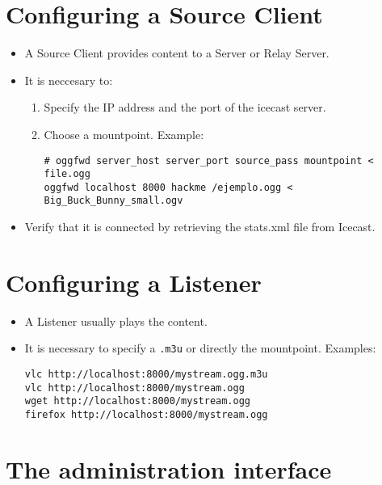 
\section{Configuring a Source Client}

\begin{itemize}
\item A Source Client provides content to a Server or Relay Server.
\item It is neccesary to:
  \begin{enumerate}
  \item Specify the IP address and the port of the icecast server.
  \item Choose a mountpoint. Example:
\begin{verbatim}
# oggfwd server_host server_port source_pass mountpoint < file.ogg
oggfwd localhost 8000 hackme /ejemplo.ogg < Big_Buck_Bunny_small.ogv
\end{verbatim}
  \end{enumerate}
\item Verify that it is connected by retrieving the stats.xml file
  from Icecast.
\end{itemize}


\section{Configuring a Listener}

\begin{itemize}
\item A Listener usually plays the content. 
\item It is necessary to specify a \texttt{.m3u} or directly the
  mountpoint. Examples:
\begin{verbatim}
vlc http://localhost:8000/mystream.ogg.m3u
vlc http://localhost:8000/mystream.ogg
wget http://localhost:8000/mystream.ogg
firefox http://localhost:8000/mystream.ogg
\end{verbatim}

\end{itemize}


\section{The administration interface}

